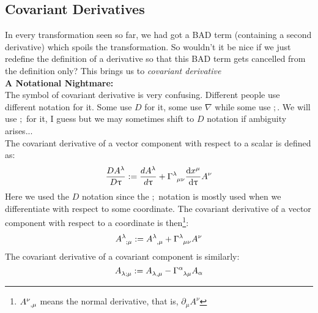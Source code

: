 \subsection{Covariant Derivatives}
In every transformation seen so far, we had got a BAD term (containing a second derivative) which spoils the transformation. So wouldn't it be nice if we just redefine the definition of a derivative so that this BAD term gets cancelled from the definition only? This brings us to \textit{covariant derivative} 
\\[0.3cm]
\textbf{A Notational Nightmare:}\\[0.3cm]
The symbol of covariant derivative is very confusing. Different people use different notation for it. Some use $D$ for it, some use $\nabla$ while some use $;$. We will use $;$ for it, I guess but we may sometimes shift to $D$ notation if ambiguity arises...\\[0.3cm]
The covariant derivative of a vector component with respect to a scalar is defined as:
$$\frac{DA^\lambda}{D\uptau} := \frac{dA^\lambda}{d\uptau}+ \tensor{\Gamma}{^\lambda _\mu _\nu}\dv{x^\mu}{\uptau}A^\nu$$
Here we used the $D$ notation since the $;$ notation is mostly used when we differentiate with respect to some coordinate. The covariant derivative of a vector component with respect to a coordinate is then\footnote{$\tensor{A}{^\nu _, _\mu}$ means the normal derivative, that is, $\partial_\mu A^\nu$}: 
$$\tensor{A}{^\lambda _; _\mu} :=  \tensor{A}{^\lambda _, _\mu} +\tensor{\Gamma}{^\lambda _\mu _\nu}A^\nu$$
The covariant derivative of a covariant component is similarly:
$$\tensor{A}{_\lambda _; _\mu} :=  \tensor{A}{_\lambda _, _\mu} -\tensor{\Gamma}{^\alpha _\lambda _\mu}A_\alpha$$
